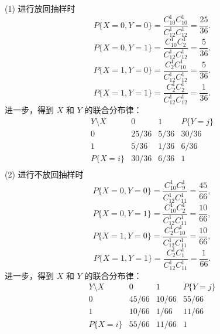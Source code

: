 \begin{solution}
    (1) 进行放回抽样时
    $$
        P\{X=0,Y=0\}
        = \frac{C_{10}^1C_{10}^1}{C_{12}^1C_{12}^1}
        = \frac{25}{36}.
    $$
    $$
        P\{X=0,Y=1\}
        = \frac{C_{10}^1C_{2}^1}{C_{12}^1C_{12}^1}
        = \frac{5}{36}.
    $$
    $$
        P\{X=1,Y=0\}
        = \frac{C_2^1C_{10}^1}{C_{12}^1C_{12}^1}
        = \frac{5}{36}.
    $$
    $$
        P\{X=1,Y=1\}
        = \frac{C_2^1C_2^1}{C_{12}^1C_{12}^1}
        = \frac{1}{36}.
    $$
    进一步，得到 $X$ 和 $Y$ 的联合分布律：
    $$
        \begin{array}{c|cc|c}
            Y \setminus X & 0     & 1    & P\{Y=j\} \\
            \hline
            0             & 25/36 & 5/36 & 30/36    \\
            1             & 5/36  & 1/36 & 6/36     \\
            \hline
            P\{X=i\}      & 30/36 & 6/36 & 1        \\
        \end{array}
    $$
    (2) 进行不放回抽样时
    $$
        P\{X=0,Y=0\}
        = \frac{C_{10}^1C_9^1}{C_{12}^1C_{11}^1}
        = \frac{45}{66},
    $$
    $$
        P\{X=0,Y=1\}
        = \frac{C_{10}^1C_2^1}{C_{12}^1C_{11}^1}
        = \frac{10}{66},
    $$
    $$
        P\{X=1,Y=0\}
        = \frac{C_2^1C_{10}^1}{C_{12}^1C_{11}^1}
        = \frac{10}{66},
    $$
    $$
        P\{X=1,Y=1\}
        = \frac{C_2^1C_1^1}{C_{12}^1C_{11}^1}
        = \frac{1}{66}.
    $$
    进一步，得到 $X$ 和 $Y$ 的联合分布律：
    $$
        \begin{array}{c|cc|c}
            Y \setminus X & 0     & 1     & P\{Y=j\} \\
            \hline
            0             & 45/66 & 10/66 & 55/66    \\
            1             & 10/66 & 1/66  & 11/66    \\
            \hline
            P\{X=i\}      & 55/66 & 11/66 & 1        \\
        \end{array}
    $$
\end{solution}


